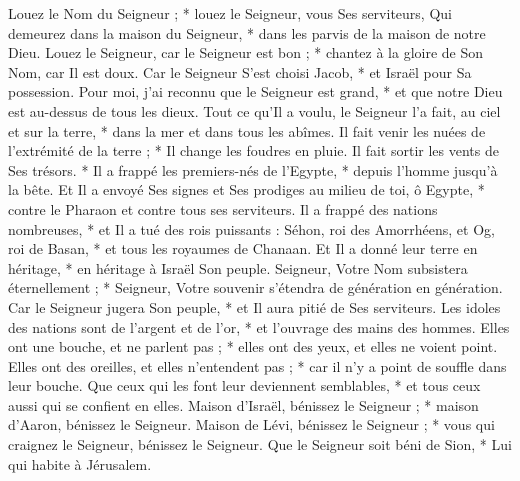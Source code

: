  Louez le Nom du Seigneur ; * louez le Seigneur, vous Ses serviteurs,
\versseparator
 Qui demeurez dans la maison du Seigneur, * dans les parvis de la maison de notre Dieu.
\versseparator
 Louez le Seigneur, car le Seigneur est bon ; * chantez à la gloire de Son Nom, car Il est doux.
\versseparator
 Car le Seigneur S'est choisi Jacob, * et Israël pour Sa possession.
\versseparator
 Pour moi, j'ai reconnu que le Seigneur est grand, * et que notre Dieu est au-dessus de tous les dieux.
\versseparator
 Tout ce qu'Il a voulu, le Seigneur l'a fait, au ciel et sur la terre, * dans la mer et dans tous les abîmes.
\versseparator
 Il fait venir les nuées de l'extrémité de la terre ; * Il change les foudres en pluie. Il fait sortir les vents de Ses trésors. *
\versseparator
 Il a frappé les premiers-nés de l'Egypte, * depuis l'homme jusqu'à la bête.
\versseparator
 Et Il a envoyé Ses signes et Ses prodiges au milieu de toi, ô Egypte, * contre le Pharaon et contre tous ses serviteurs.
\versseparator
 Il a frappé des nations nombreuses, * et Il a tué des rois puissants :
\versseparator
 Séhon, roi des Amorrhéens, et Og, roi de Basan, * et tous les royaumes de Chanaan.
\versseparator
 Et Il a donné leur terre en héritage, * en héritage à Israël Son peuple.
\versseparator
 Seigneur, Votre Nom subsistera éternellement ; * Seigneur, Votre souvenir s'étendra de génération en génération.
\versseparator
 Car le Seigneur jugera Son peuple, * et Il aura pitié de Ses serviteurs.
\versseparator
 Les idoles des nations sont de l'argent et de l'or, * et l'ouvrage des mains des hommes.
\versseparator
 Elles ont une bouche, et ne parlent pas ; * elles ont des yeux, et elles ne voient point.
\versseparator
 Elles ont des oreilles, et elles n'entendent pas ; * car il n'y a point de souffle dans leur bouche.
\versseparator
 Que ceux qui les font leur deviennent semblables, * et tous ceux aussi qui se confient en elles.
\versseparator
 Maison d'Israël, bénissez le Seigneur ; * maison d'Aaron, bénissez le Seigneur.
\versseparator
 Maison de Lévi, bénissez le Seigneur ; * vous qui craignez le Seigneur, bénissez le Seigneur.
\versseparator
 Que le Seigneur soit béni de Sion, * Lui qui habite à Jérusalem.